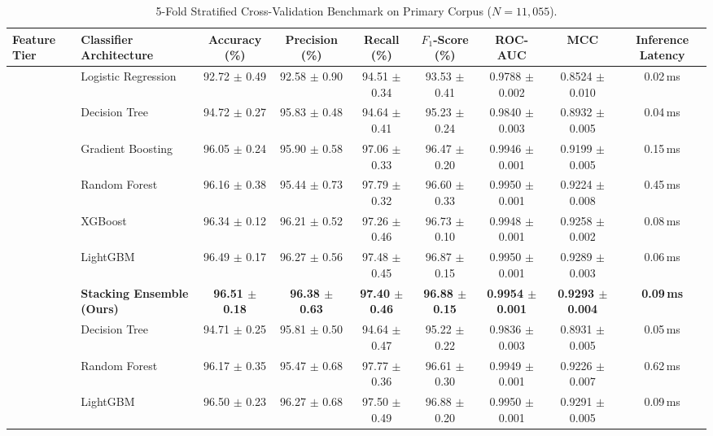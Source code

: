 \documentclass[journal]{IEEEtran}
\begin{document}
\begin{table}[t]
\centering
\caption{5-Fold Stratified Cross-Validation Benchmark on Primary Corpus ($N = 11,055$).}
\label{tab:cv_detailed_results}
\begin{tabular}{llccccccc}
\toprule
\textbf{Feature Tier} & \textbf{Classifier Architecture} & \textbf{Accuracy (\%)} & \textbf{Precision (\%)} & \textbf{Recall (\%)} & \textbf{$F_1$-Score (\%)} & \textbf{ROC-AUC} & \textbf{MCC} & \textbf{Inference Latency} \\
\midrule
{} 
 & Logistic Regression & 92.72 $\pm$ 0.49 & 92.58 $\pm$ 0.90 & 94.51 $\pm$ 0.34 & 93.53 $\pm$ 0.41 & 0.9788 $\pm$ 0.002 & 0.8524 $\pm$ 0.010 & 0.02\,ms \\
 & Decision Tree & 94.72 $\pm$ 0.27 & 95.83 $\pm$ 0.48 & 94.64 $\pm$ 0.41 & 95.23 $\pm$ 0.24 & 0.9840 $\pm$ 0.003 & 0.8932 $\pm$ 0.005 & 0.04\,ms \\
 & Gradient Boosting & 96.05 $\pm$ 0.24 & 95.90 $\pm$ 0.58 & 97.06 $\pm$ 0.33 & 96.47 $\pm$ 0.20 & 0.9946 $\pm$ 0.001 & 0.9199 $\pm$ 0.005 & 0.15\,ms \\
 & Random Forest & 96.16 $\pm$ 0.38 & 95.44 $\pm$ 0.73 & 97.79 $\pm$ 0.32 & 96.60 $\pm$ 0.33 & 0.9950 $\pm$ 0.001 & 0.9224 $\pm$ 0.008 & 0.45\,ms \\
 & XGBoost & 96.34 $\pm$ 0.12 & 96.21 $\pm$ 0.52 & 97.26 $\pm$ 0.46 & 96.73 $\pm$ 0.10 & 0.9948 $\pm$ 0.001 & 0.9258 $\pm$ 0.002 & 0.08\,ms \\
 & LightGBM & 96.49 $\pm$ 0.17 & 96.27 $\pm$ 0.56 & 97.48 $\pm$ 0.45 & 96.87 $\pm$ 0.15 & 0.9950 $\pm$ 0.001 & 0.9289 $\pm$ 0.003 & 0.06\,ms \\
 & \textbf{Stacking Ensemble (Ours)} & \textbf{96.51 $\pm$ 0.18} & \textbf{96.38 $\pm$ 0.63} & \textbf{97.40 $\pm$ 0.46} & \textbf{96.88 $\pm$ 0.15} & \textbf{0.9954 $\pm$ 0.001} & \textbf{0.9293 $\pm$ 0.004} & \textbf{0.09\,ms} \\
\midrule
{} 
 & Decision Tree & 94.71 $\pm$ 0.25 & 95.81 $\pm$ 0.50 & 94.64 $\pm$ 0.47 & 95.22 $\pm$ 0.22 & 0.9836 $\pm$ 0.003 & 0.8931 $\pm$ 0.005 & 0.05\,ms \\
 & Random Forest & 96.17 $\pm$ 0.35 & 95.47 $\pm$ 0.68 & 97.77 $\pm$ 0.36 & 96.61 $\pm$ 0.30 & 0.9949 $\pm$ 0.001 & 0.9226 $\pm$ 0.007 & 0.62\,ms \\
 & LightGBM & 96.50 $\pm$ 0.23 & 96.27 $\pm$ 0.68 & 97.50 $\pm$ 0.49 & 96.88 $\pm$ 0.20 & 0.9950 $\pm$ 0.001 & 0.9291 $\pm$ 0.005 & 0.09\,ms \\

\end{tabular}
\end{table}
\end{document}
